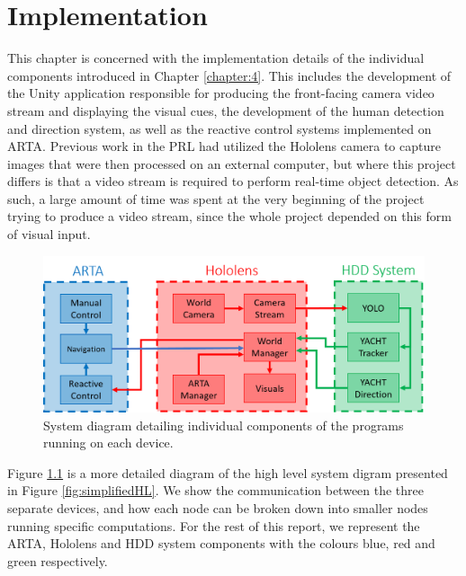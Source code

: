 \chapter{Implementation}
This chapter is concerned with the implementation details of the individual components introduced in Chapter \ref{chapter:4}. This includes the development of the Unity application responsible for producing the front-facing camera video stream and displaying the visual cues, the development of the human detection and direction system, as well as the reactive control systems implemented on ARTA. Previous work in the PRL had utilized the Hololens camera to capture images that were then processed on an external computer, but where this project differs is that a video stream is required to perform real-time object detection. As such, a large amount of time was spent at the very beginning of the project trying to produce a video stream, since the whole project depended on this form of visual input.

\begin{figure}[ht]
	\centering
	\includegraphics[width=1.0\linewidth]{img/chapter5_implementation/detailedSystemDiagram.png}
	\caption{System diagram detailing individual components of the programs running on each device.}
	\label{fig:detailedHL}
\end{figure}

Figure \ref{fig:detailedHL} is a more detailed diagram of the high level system digram presented in Figure \ref{fig:simplifiedHL}. We show the communication between the three separate devices, and how each node can be broken down into smaller nodes running specific computations. For the rest of this report, we represent the ARTA, Hololens and HDD system components with the colours blue, red and green respectively.


